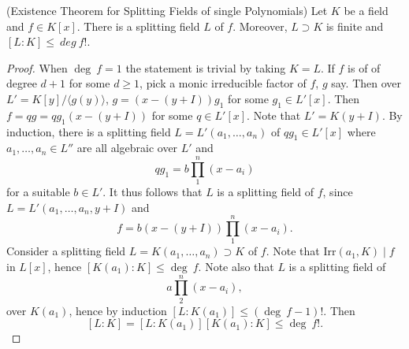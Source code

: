     \begin{theorem}\label{ExistenceTheoremForSplittingField}(Existence Theorem for Splitting Fields of single Polynomials) 
        Let $K$ be a field and $f\in K[x]$. There is a splitting field $L$ of $f$. Moreover, $L\supset K$ is finite and $[L : K] \leq \ deg \ f !$.
    \end{theorem}
    \begin{proof}
        When $\deg \ f = 1$ the statement is trivial by taking $K=L$. If $f$ is of of degree $d+1$ for some $d\geq 1$, pick a monic irreducible factor of $f$, $g$ say. Then over $L' = K[y]/\langle g(y)\rangle$, $g =(x - (y+I))g_1 $ for some $g_1\in L'[x]$. Then $f=qg=qg_1(x-(y+I))$ for some $q\in L'[x]$. Note that $L' = K(y+I)$. By induction, there is a splitting field $L=L'(a_1,\dots,a_n)$ of $qg_1\in L'[x]$ where $a_1,\dots,a_n\in L''$ are all algebraic over $L'$ and   
        $$qg_1 = b\prod_1^n (x-a_i)$$
        for a suitable $b\in L'$. It thus follows that $L$ is a splitting field of $f$, since $L = L'(a_1,\dots,a_n,y+I)$ and  
        $$f = b (x-(y+I))\prod_1^n (x-a_i).$$ 
        Consider a splitting field $L=K(a_1,\dots,a_n)\supset K$ of $f$. Note that $\mathrm{Irr}(a_1,K) \mid f$ in $L[x]$, hence $[K(a_1) : K] \leq \deg \ f$. Note also that $L$ is a splitting field of 
        $$
            a\prod_2^n (x-a_i),
        $$
        over $K(a_1)$, hence by induction $[L:K(a_1)] \leq (\deg \ f -1)!$. Then 
        $$
            [L : K] = [L: K(a_1)][K(a_1) : K] \leq \deg \ f !.
        $$ 
    \end{proof}
  
